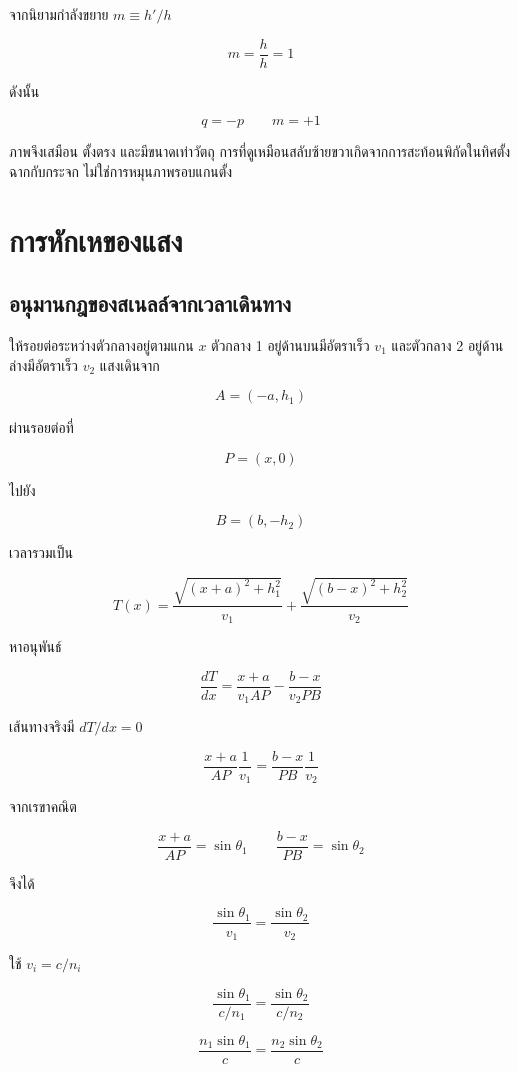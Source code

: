จากนิยามกำลังขยาย $m\equiv h'/h$

\[
m=\frac{h}{h}=1
\]

ดังนั้น

\begin{tcolorbox}[title={กระจกเงาราบ}]
\[
\boxed{q=-p}
\qquad
\boxed{m=+1}
\]
\end{tcolorbox}

ภาพจึงเสมือน ตั้งตรง และมีขนาดเท่าวัตถุ การที่ดูเหมือนสลับซ้ายขวาเกิดจากการสะท้อนพิกัดในทิศตั้งฉากกับกระจก ไม่ใช่การหมุนภาพรอบแกนตั้ง

\section{การหักเหของแสง}

\subsection{อนุมานกฎของสเนลล์จากเวลาเดินทาง}

ให้รอยต่อระหว่างตัวกลางอยู่ตามแกน $x$ ตัวกลาง 1 อยู่ด้านบนมีอัตราเร็ว $v_1$ และตัวกลาง 2 อยู่ด้านล่างมีอัตราเร็ว $v_2$ แสงเดินจาก

\[
A=(-a,h_1)
\]

ผ่านรอยต่อที่

\[
P=(x,0)
\]

ไปยัง

\[
B=(b,-h_2)
\]

เวลารวมเป็น

\[
T(x)
=
\frac{\sqrt{(x+a)^2+h_1^2}}{v_1}
+
\frac{\sqrt{(b-x)^2+h_2^2}}{v_2}
\]

หาอนุพันธ์

\[
\frac{dT}{dx}
=
\frac{x+a}{v_1AP}
-
\frac{b-x}{v_2PB}
\]

เส้นทางจริงมี $dT/dx=0$

\[
\frac{x+a}{AP}\frac{1}{v_1}
=
\frac{b-x}{PB}\frac{1}{v_2}
\]

จากเรขาคณิต

\[
\frac{x+a}{AP}=\sin\theta_1
\qquad
\frac{b-x}{PB}=\sin\theta_2
\]

จึงได้

\[
\frac{\sin\theta_1}{v_1}
=
\frac{\sin\theta_2}{v_2}
\]

ใช้ $v_i=c/n_i$

\[
\frac{\sin\theta_1}{c/n_1}
=
\frac{\sin\theta_2}{c/n_2}
\]

\[
\frac{n_1\sin\theta_1}{c}
=
\frac{n_2\sin\theta_2}{c}
\]

